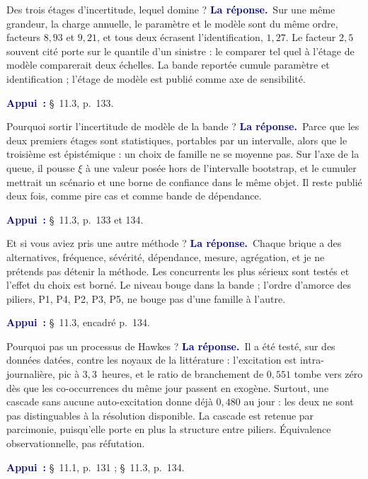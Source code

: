 \documentclass[11pt,a4paper]{article}
\newcommand{\rep}[1]{\smallskip\noindent\textcolor{navy}{\textbf{La réponse.}}\ #1\par}
\newcommand{\appui}[1]{\smallskip\noindent\small\textcolor{navy}{\textbf{Appui~:}} #1\par\normalsize}
\begin{document}
\begin{question}{\og Des trois étages d'incertitude, lequel domine ?\fg{}}
\rep{Sur une même grandeur, la charge annuelle, le paramètre et le modèle sont du même ordre,
facteurs $8{,}93$ et $9{,}21$, et tous deux écrasent l'identification, $1{,}27$. Le facteur $2{,}5$
souvent cité porte sur le quantile d'un sinistre : le comparer tel quel à l'étage de modèle
comparerait deux échelles. La bande reportée cumule paramètre et identification ; l'étage de modèle
est publié comme axe de sensibilité.}
\appui{\S~11.3, p.~133.}
\end{question}

\begin{question}{\og Pourquoi sortir l'incertitude de modèle de la bande ?\fg{}}
\rep{Parce que les deux premiers étages sont statistiques, portables par un intervalle, alors que
le troisième est épistémique : un choix de famille ne se moyenne pas. Sur l'axe de la queue, il
pousse $\xi$ à une valeur posée hors de l'intervalle bootstrap, et le cumuler mettrait un scénario
et une borne de confiance dans le même objet. Il reste publié deux fois, comme pire cas et comme
bande de dépendance.}
\appui{\S~11.3, p.~133 et 134.}
\end{question}

\begin{question}{\og Et si vous aviez pris une autre méthode ?\fg{}}
\rep{Chaque brique a des alternatives, fréquence, sévérité, dépendance, mesure, agrégation, et je
ne prétends pas détenir la méthode. Les concurrents les plus sérieux sont testés et l'effet du
choix est borné. Le niveau bouge dans la bande ; l'ordre d'amorce des piliers, P1, P4, P2, P3, P5,
ne bouge pas d'une famille à l'autre.}
\appui{\S~11.3, encadré p.~134.}
\end{question}

\begin{question}{\og Pourquoi pas un processus de Hawkes ?\fg{}}
\rep{Il a été testé, sur des données datées, contre les noyaux de la littérature : l'excitation est
intra-journalière, pic à $3{,}3$~heures, et le ratio de branchement de $0{,}551$ tombe vers zéro dès
que les co-occurrences du même jour passent en exogène. Surtout, une cascade sans aucune
auto-excitation donne déjà $0{,}480$ au jour : les deux ne sont pas distinguables à la résolution
disponible. La cascade est retenue par parcimonie, puisqu'elle porte en plus la structure entre
piliers. Équivalence observationnelle, pas réfutation.}
\appui{\S~11.1, p.~131 ; \S~11.3, p.~134.}
\end{question}
\end{document}
